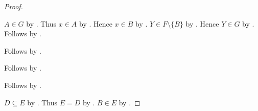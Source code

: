 \begin{proof}
\begin{subproof}
\begin{subproof}
\begin{subproof}
\begin{subproof}
\begin{byCase}
                        $A\in G$ by .
                        Thus $x\in A$ by .
                        Hence $x\in B$ by .
                        $Y\in F\setminus\{B\}$ by
                            .
                        Hence $Y\in G$ by .
                        Follows by .
                    \end{byCase}
                \end{subproof}
                Follows by .
            \end{subproof}
            Follows by .
        \end{subproof}
        Follows by .
    \end{subproof}

    $D\subseteq E$ by .
    Thus $E=D$ by .
    $B\in E$ by .
\end{proof}

